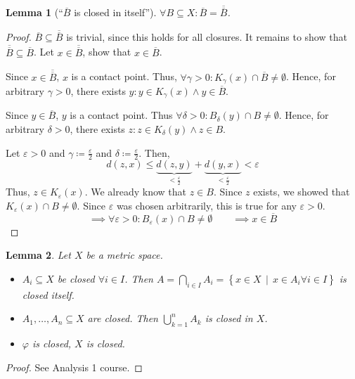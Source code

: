 \documentclass{article}
\newtheorem{lemma}{Lemma}  \numberwithin{lemma}{section}
\newcommand{\setdef}[2]{\left\{\left.#1\,\middle|\,#2\right.\right\}}
\newcommand\doubleoverline[1]{\overline{\overline{#1}}}
\begin{document}
\begin{lemma}[\enquote{$\overline{B}$ is closed in itself}]
  $\forall B \subseteq X: \overline{B} = \doubleoverline{B}$.
\end{lemma}
\begin{proof}
  $\overline B \subseteq \doubleoverline B$ is trivial, since this holds for all closures. It remains to show that $\doubleoverline B \subseteq \overline B$. Let $x \in \doubleoverline B$, show that $x \in \overline{B}$.


  Since $x \in \doubleoverline{B}$, $x$ is a contact point. Thus, $\forall \gamma > 0: K_\gamma(x) \cap \overline{B} \neq \emptyset$.
  Hence, for arbitrary $\gamma > 0$, there exists $y: y \in K_\gamma(x) \land y \in \overline{B}$.

  Since $y \in \overline{B}$, $y$ is a contact point. Thus $\forall \delta > 0: B_\delta(y) \cap B \neq \emptyset$.
  Hence, for arbitrary $\delta > 0$, there exists $z: z \in K_\delta(y) \land z \in B$.

  Let $\varepsilon > 0$ and $\gamma \coloneqq \frac\varepsilon2$ and $\delta \coloneqq \frac\varepsilon2$. Then,
  \[ d(z,x) \leq \underbrace{d(z,y)}_{<\frac\varepsilon2} + \underbrace{d(y,x)}_{<\frac\varepsilon2} < \varepsilon \]
  Thus, $z \in K_\varepsilon(x)$. We already know that $z \in B$.
  Since $z$ exists, we showed that $K_\varepsilon(x) \cap B \neq \emptyset$.
  Since $\varepsilon$ was chosen arbitrarily, this is true for any $\varepsilon > 0$.
  \[ \implies \forall \varepsilon > 0: B_\varepsilon(x) \cap B \neq \emptyset \qquad \implies x \in \overline{B} \]
\end{proof}

\begin{lemma}
  \label{lemma4}
  Let $X$ be a metric space.
  \begin{itemize}
    \item
      $A_i \subseteq X$ be closed $\forall i \in I$.
      Then $A = \bigcap_{i \in I} A_i = \setdef{x \in X}{x \in A_i \forall i \in I}$
      is closed itself.
    \item
      $A_1, \dots, A_n \subseteq X$ are closed. Then $\bigcup_{k=1}^n A_k$ is closed in $X$.
    \item
      $\varphi$ is closed, $X$ is closed.
  \end{itemize}
\end{lemma}

\begin{proof}
  See Analysis 1 course.
\end{proof}
\end{document}
